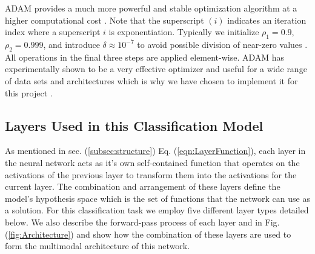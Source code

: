\documentclass[conference,onecolumn,letterpaper]{IEEEtran}
\begin{document}
ADAM provides a much more powerful and stable optimization algorithm at a higher computational cost \cite{Geron,Tensorflow}. Note that the superscript $(i)$ indicates an iteration index where a superscript $i$ is exponentiation. Typically we initialize $\rho_1 = 0.9$, $\rho_2 = 0.999$, and introduce $\delta \approx 10^{-7}$ to avoid possible division of near-zero values \cite{Goodfellow}. All operations in the final three steps are applied element-wise. ADAM has experimentally shown to be a very effective optimizer and useful for a wide range of data sets and architectures which is why we have chosen to implement it for this project \cite{Geron,Goodfellow}.


\subsection{Layers Used in this Classification Model}
\label{sec:LayersUsed}

As mentioned in sec. (\ref{subsec:structure}) Eq. (\ref{eqn:LayerFunction}), each layer in the neural network acts as it's own self-contained function that operates on the activations of the previous layer to transform them into the activations for the current layer. The combination and arrangement of these layers define the model's hypothesis space which is the set of functions that the network can use as a solution. For this classification task we employ five different layer types detailed below. We also describe the forward-pass process of each layer and in Fig. (\ref{fig:Architecture}) and show how the combination of these layers are used to form the multimodal architecture of this network. 
\end{document}
